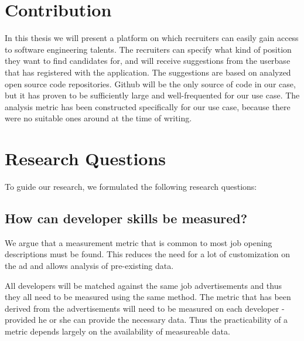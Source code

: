\section{Contribution}
In this thesis we will present a platform on which recruiters can easily
gain access to software engineering talents. The recruiters can specify
what kind of position they want to find candidates for, and will receive
suggestions from the userbase that has registered with the application.
The suggestions are based on analyzed open source code repositories.
Github will be the only source of code in our case, but it has proven
to be sufficiently large and well-frequented for our use case.
The analysis metric has been constructed specifically for our use case,
because there were no suitable ones around at the time of writing.

\section{Research Questions} \label{sec:research-questions}
To guide our research, we formulated the following research questions:

\subsection{How can developer skills be measured?}\label{subsec:dev-skill-measurement}
We argue that a measurement metric that is common to most job opening
descriptions must be found. This reduces the need for a lot of customization
on the ad and allows analysis of pre-existing data.
\newline

All developers will be matched against the same job advertisements and thus
they all need to be measured using the same method. The metric that
has been derived from the advertisements will need to be measured
on each developer - provided he or she can provide the necessary data.
Thus the practicability of a metric depends largely on the availability
of measureable data.

